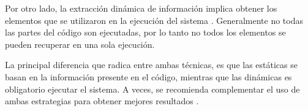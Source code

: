 \documentclass[a4paper,12pt]{report}
\begin{document}

Por otro lado, la extracción dinámica de información implica obtener los elementos que se utilizaron en la ejecución del sistema \cite{THBE99}. Generalmente no todas las partes del código son ejecutadas, por lo tanto no todos los elementos se pueden recuperar en una sola ejecución.

 
La principal diferencia que radica entre ambas técnicas,  es que las estáticas se basan en la información presente en el código, mientras que las dinámicas es obligatorio ejecutar el sistema.
A veces, se recomienda complementar el uso de ambas estrategias para obtener mejores resultados \cite{TERD01}.





\end{document}
